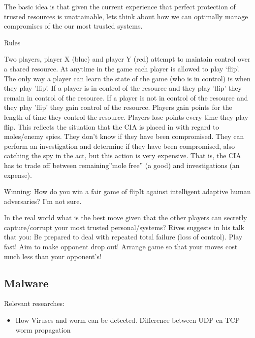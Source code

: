 The basic idea is that given the current experience that perfect protection of trusted resources is unattainable, lets think about how we can optimally manage compromises of the our most trusted systems.

Rules

Two players, player X (blue) and player Y (red) attempt to maintain control over a shared resource.
At anytime in the game each player is allowed to play ‘flip’.
The only way a player can learn the state of the game (who is in control) is when they play 'flip’.
If a player is in control of the resource and they play 'flip’ they remain in control of the resource.
If a player is not in control of the resource and they play 'flip’ they gain control of the resource.
Players gain points for the length of time they control the resource.
Players lose points every time they play flip.
This reflects the situation that the CIA is placed in with regard to moles/enemy spies. They don't know if they have been compromised. They can perform an investigation and determine if they have been compromised, also catching the spy in the act, but this action is very expensive. That is, the CIA has to trade off between remaining''mole free'' (a good) and investigations (an expense).

Winning: How do you win a fair game of flipIt against intelligent adaptive human adversaries? I'm not sure.

In the real world what is the best move given that the other players can secretly capture/corrupt your most trusted personal/systems? Rives suggests in his talk that you:
Be prepared to deal with repeated total failure (loss of control).
Play fast! Aim to make opponent drop out!
Arrange game so that your moves cost much less than your opponent's!



\subsection{Malware}
Relevant researches:
\begin{itemize}
\item How Viruses and worm can be detected. Difference between UDP en TCP worm propagation
\end{itemize}




